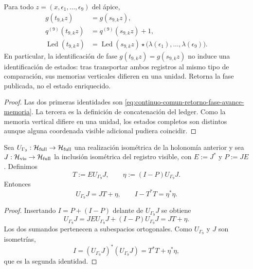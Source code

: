 \begin{proposition}
\label{prop:continuo-comun-gamma9-retorno-memoria}
Para todo \(z=(x,\epsilon_1,\ldots,\epsilon_9)\) del ápice,
\begin{align}
 g(t_{9,k}z)&=g(s_{9,k}z),
 \label{eq:continuo-comun-gamma9-retorno-fase}\\
 q^{(9)}(t_{9,k}z)&=q^{(9)}(s_{9,k}z)+1,
 \label{eq:continuo-comun-gamma9-avance-memoria}\\
 \operatorname{Led}(t_{9,k}z)
 &=\operatorname{Led}(s_{9,k}z)\star
   \bigl(\lambda(\epsilon_1),\ldots,\lambda(\epsilon_9)\bigr).
 \label{eq:continuo-comun-gamma9-ledger}
\end{align}
En particular, la identificación de fase
\(g(t_{9,k}z)=g(s_{9,k}z)\) no induce una identificación de estados: tras
transportar ambos registros al mismo tipo de comparación, sus memorias
verticales difieren en una unidad. Retorna la fase publicada, no el estado
enriquecido.
\end{proposition}

\begin{proof}
Las dos primeras identidades son
\eqref{eq:continuo-comun-retorno-fase-avance-memoria}. La tercera es la
definición de concatenación del ledger. Como la memoria vertical difiere en
una unidad, los estados completos son distintos aunque alguna coordenada
visible adicional pudiera coincidir.
\end{proof}

\begin{proposition}
\label{prop:continuo-comun-gamma9-compresion-isometrica}
Sea \(U_{\Gamma_9}:\mathcal H_{\rm full}\to\mathcal H_{\rm full}\) una
realización isométrica de la holonomía anterior y sea
\(J:\mathcal H_{\rm vis}\to\mathcal H_{\rm full}\) la inclusión isométrica
del registro visible, con \(E:=J^*\) y \(P:=JE\). Definimos
\begin{equation}
\label{eq:continuo-comun-gamma9-compresion-datos}
 T:=EU_{\Gamma_9}J,\qquad
 \eta:=(I-P)U_{\Gamma_9}J.
\end{equation}
Entonces
\begin{equation}
\label{eq:continuo-comun-gamma9-compresion}
 \boxed{\;
 U_{\Gamma_9}J=JT+\eta,\qquad
 I-T^*T=\eta^*\eta.
 \;}
\end{equation}
\end{proposition}

\begin{proof}
Insertando \(I=P+(I-P)\) delante de \(U_{\Gamma_9}J\) se obtiene
\[
 U_{\Gamma_9}J
 =JEU_{\Gamma_9}J+(I-P)U_{\Gamma_9}J
 =JT+\eta.
\]
Los dos sumandos pertenecen a subespacios ortogonales. Como
\(U_{\Gamma_9}\) y \(J\) son isometrías,
\[
 I=(U_{\Gamma_9}J)^*(U_{\Gamma_9}J)
   =T^*T+\eta^*\eta,
\]
que es la segunda identidad.
\end{proof}

